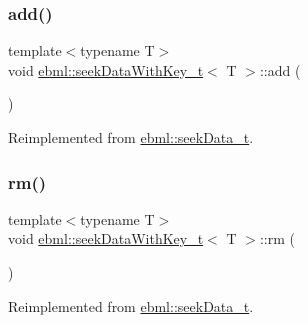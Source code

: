 \subsubsection{\texorpdfstring{add()}{add()}}
{\footnotesize\ttfamily template$<$typename T$>$ \\
void \mbox{\hyperlink{classebml_1_1seekDataWithKey__t}{ebml\+::seek\+Data\+With\+Key\+\_\+t}}$<$ T $>$\+::add (\begin{DoxyParamCaption}\item[{std\+::unordered\+\_\+map$<$ \mbox{\hyperlink{namespaceebml_a86c5f604ddf12a74aa9812e997a58691}{ebml\+I\+D\+\_\+t}}, std\+::unique\+\_\+ptr$<$ \mbox{\hyperlink{classebml_1_1seekMapBase}{seek\+Map\+Base}} $>$$>$ \&}]{ }\end{DoxyParamCaption})\hspace{0.3cm}{\ttfamily [virtual]}}



Reimplemented from \mbox{\hyperlink{classebml_1_1seekData__t_a6ca62e902490d42a3dd03cfd23452016}{ebml\+::seek\+Data\+\_\+t}}.

\mbox{\label{classebml_1_1seekDataWithKey__t_afc028f689e5c536e26ca8619d6dbb0a2}} 
\subsubsection{\texorpdfstring{rm()}{rm()}}
{\footnotesize\ttfamily template$<$typename T$>$ \\
void \mbox{\hyperlink{classebml_1_1seekDataWithKey__t}{ebml\+::seek\+Data\+With\+Key\+\_\+t}}$<$ T $>$\+::rm (\begin{DoxyParamCaption}\item[{std\+::unordered\+\_\+map$<$ \mbox{\hyperlink{namespaceebml_a86c5f604ddf12a74aa9812e997a58691}{ebml\+I\+D\+\_\+t}}, std\+::unique\+\_\+ptr$<$ \mbox{\hyperlink{classebml_1_1seekMapBase}{seek\+Map\+Base}} $>$$>$ \&}]{ }\end{DoxyParamCaption})\hspace{0.3cm}{\ttfamily [virtual]}}



Reimplemented from \mbox{\hyperlink{classebml_1_1seekData__t_a1f0da8c547bc52496bc4716ec732d138}{ebml\+::seek\+Data\+\_\+t}}.



